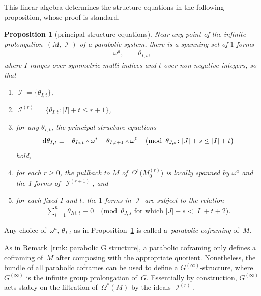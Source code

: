 \documentclass[10pt,a4paper]{amsart}
\DeclareMathOperator{\I}{\mathcal{I}}
\renewcommand{\d}{{\rm d}}
\renewcommand{\mod}[1]{\quad\big(\mathrm{mod\enspace} #1\big)}
\newcommand{\w}{{\mathchoice{\,{\scriptstyle\wedge}\,}{{\scriptstyle\wedge}}
 {{\scriptscriptstyle\wedge}}{{\scriptscriptstyle\wedge}}}}
\newcommand{\M}[1]{M_0^{(#1)}}
\newcommand{\thetas}[1]{\theta_{#1}}
\numberwithin{equation}{section}
\newtheorem{Proposition}[Theorem]{Proposition}
{ \theoremstyle{definition}
\newtheorem{Definition}[Theorem]{Definition}
\newtheorem{Example}[Theorem]{Example}
\newtheorem{Remark}[Theorem]{Remark} }
\begin{document}
This linear algebra determines the structure equations in the following proposition, whose proof is standard.
\begin{Proposition}[principal structure equations]\label{thm:principal structure equations}
 Near any point of the infinite prolonga\-tion~$(M, \I)$ of a parabolic system, there is a spanning set of $1$-forms
 \begin{gather*}
 \omega^a, \qquad \thetas{I,t} ,
 \end{gather*}
 where $I$ ranges over symmetric multi-indices and $t$ over non-negative integers, so that
 \begin{enumerate}\itemsep=0pt
 \item[$1.$] $\I = \{\thetas{I,t}\}$,

 \item[$2.$] $\I^{(r)} = \{\thetas{I,t} \colon |I| + t \le r + 1\}$,

 \item[$3.$] for any $\thetas{I,t}$,
 the principal structure equations
 \begin{gather}\label{eq:principal structure equations}
 \d\thetas{I,t} \equiv - \thetas{Ii,t}\w\omega^i - \thetas{I,t+1}\w\omega^0 \mod{\thetas{J,s} \colon |J| + s \le |I| + t}
 \end{gather}
 hold,

 \item[$4.$] for each $r\ge 0$, the pullback to $M$ of~$\Omega^1\big(\M{r}\big)$ is locally spanned by $\omega^a$ and the 1-forms of~$\I^{(r+1)}$, and

 \item[$5.$] for each fixed $I$ and $t$, the $ 1 $-forms in $\I$ are subject to the relation
 \begin{gather*}
 \sum_{i=1}^n \thetas{Iii,t} \equiv 0 \mod{\thetas{J,s} \mbox{ for which } |J| + s < |I| + t + 2} .
 \end{gather*}
 \end{enumerate}
\end{Proposition}

\begin{Definition}
 Any choice of~$\omega^a$, $\thetas{I,t}$ as in Proposition~\ref{thm:principal structure equations} is called a~\emph{parabolic coframing} of~$M$.
\end{Definition}

\begin{Remark}\label{rmk: infinitely prolonged parabolic G structure}
 As in Remark~\ref{rmk: parabolic G structure}, a parabolic coframing only defines a coframing of~$M$ after composing with the appropriate quotient. Nonetheless, the bundle of all parabolic coframes can be used to define a $G^{(\infty)}$-structure, where $G^{(\infty)}$ is the infinite group prolongation of~$G$. Essentially by construction, $G^{(\infty)}$ acts stably on the filtration of~$\Omega^*(M)$ by the ideals $\I^{(r)}$.
\end{Remark}
\end{document}
